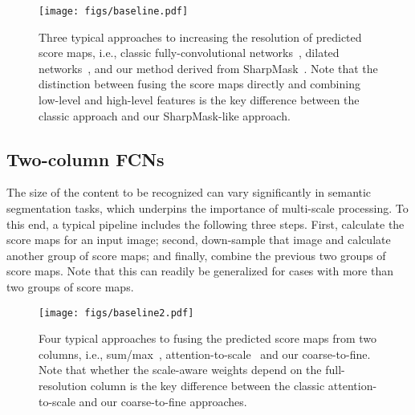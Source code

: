 \documentclass[10pt,twocolumn,letterpaper]{article}
\begin{document}
\begin{figure}[t]
\begin{center}
\texttt{[image: figs/baseline.pdf]}
\end{center}
\caption{
Three typical approaches to increasing the resolution of predicted score maps, i.e., classic fully-convolutional networks~\cite{FCN.CVPR.2015.Long}, dilated networks~\cite{DeepLab.ICLR.2015.Chen}, and our method derived from SharpMask~\cite{SharpMask.2016.Pinheiro}.
Note that the distinction between fusing the score maps directly and combining low-level and high-level features is the key difference between the classic approach and our SharpMask-like approach.
}
\label{fig:baseline}
\vspace{-3.0mm}
\end{figure}


\subsection{Two-column FCNs}
The size of the content to be recognized can vary significantly in semantic segmentation tasks,
which underpins the importance of multi-scale processing.
To this end, a typical pipeline includes the following three steps.
First, calculate the score maps for an input image;
second, down-sample that image and calculate another group of score maps;
and finally, combine the previous two groups of score maps.
Note that this can readily be generalized for cases with more than two groups of score maps.

\begin{figure}[t]
\begin{center}
\texttt{[image: figs/baseline2.pdf]}
\end{center}
\caption{
Four typical approaches to fusing the predicted score maps from two columns, i.e., sum/max~\cite{Attention2Scale.2015.Chen}, attention-to-scale~\cite{Attention2Scale.2015.Chen} and our coarse-to-fine.
Note that whether the scale-aware weights depend on the full-resolution column is the key difference between the classic attention-to-scale and our coarse-to-fine approaches.
}
\label{fig:baseline2}
\vspace{-3.0mm}
\end{figure}
\end{document}
